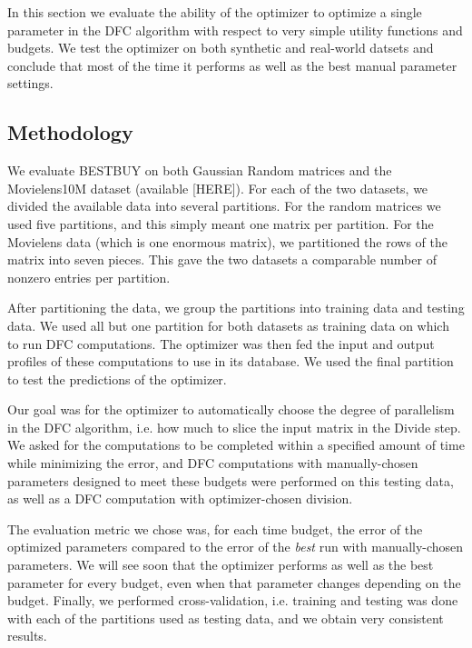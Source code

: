 
In this section we evaluate the ability of the optimizer to optimize a single parameter in the DFC algorithm with respect to very simple utility functions and budgets. We test the optimizer on both synthetic and real-world datsets and conclude that most of the time it performs as well as the best manual parameter settings. 

\subsection{Methodology}

We evaluate BESTBUY on both Gaussian Random matrices and the Movielens10M dataset (available [HERE]). For each of the two datasets, we divided the available data into several partitions. For the random matrices we used five partitions, and this simply meant one matrix per partition. For the Movielens data (which is one enormous matrix), we partitioned the rows of the matrix into seven pieces. This gave the two datasets a comparable number of nonzero entries per partition. 

After partitioning the data, we group the partitions into training data and testing data. We used all but one partition for both datasets as training data on which to run DFC computations. The optimizer was then fed the input and output profiles of these computations to use in its database. We used the final partition to test the predictions of the optimizer. 

Our goal was for the optimizer to automatically choose the degree of parallelism in the DFC algorithm, i.e. how much to slice the input matrix in the Divide step. We asked for the computations to be completed within a specified amount of time while minimizing the error, and DFC computations with manually-chosen parameters designed to meet these budgets were performed on this testing data, as well as a DFC computation with optimizer-chosen division. 

The evaluation metric we chose was, for each time budget, the error of the optimized parameters compared to the error of the \emph{best} run with manually-chosen parameters. We will see soon that the optimizer performs as well as the best parameter for every budget, even when that parameter changes depending on the budget. Finally, we performed cross-validation, i.e. training and testing was done with each of the partitions used as testing data, and we obtain very consistent results. 

